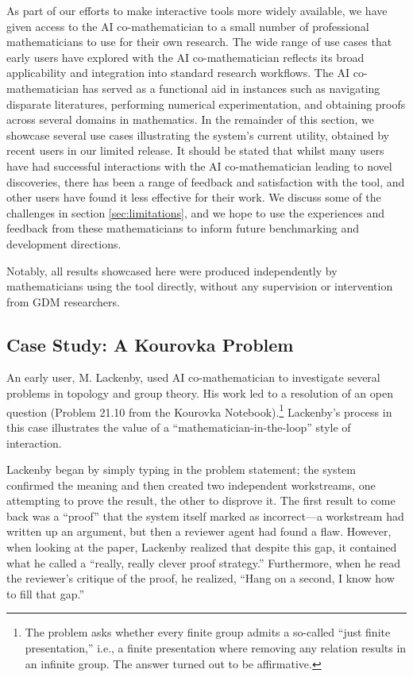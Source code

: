 \documentclass[11pt, a4paper, copyright, gdm]{google}
\begin{document}
As part of our efforts to make interactive tools more widely available, we have given access to the AI co-mathematician to a small number of professional mathematicians to use for their own research.
The wide range of use cases that early users have explored with the AI co-mathematician reflects its broad applicability and integration into standard research workflows.
The AI co-mathematician has served as a functional aid in instances such as navigating disparate literatures, performing numerical experimentation, and obtaining proofs across several domains in mathematics.
In the remainder of this section, we showcase several use cases illustrating the system's current utility, obtained by recent users in our limited release.
It should be stated that whilst many users have had successful interactions with the AI co-mathematician leading to novel discoveries, there has been a range of feedback and satisfaction with the tool, and other users have found it less effective for their work.
We discuss some of the challenges in section \ref{sec:limitations}, and we hope to use the experiences and feedback from these mathematicians to inform future benchmarking and development directions.

Notably, all results showcased here were produced independently by mathematicians using the tool directly, without any supervision or intervention from GDM researchers.


\subsection{Case Study: A Kourovka Problem}


An early user, M. Lackenby, used AI co-mathematician to investigate several problems in topology and group theory.
His work led to a resolution of an open question (Problem 21.10 from the Kourovka Notebook).\footnote{The problem asks whether every finite group admits a so-called ``just finite presentation,'' i.e., a finite presentation where removing any relation results in an infinite group. The answer turned out to be affirmative.}
Lackenby's process in this case illustrates the value of a ``mathematician-in-the-loop'' style of interaction.

Lackenby began by simply typing in the problem statement; the system confirmed the meaning and then created two independent workstreams, one attempting to prove the result, the other to disprove it.
The first result to come back was a ``proof'' that the system itself marked as incorrect---a workstream had written up an argument, but then a reviewer agent had found a flaw.
However, when looking at the paper, Lackenby realized that despite this gap, it contained what he called a ``really, really clever proof strategy.''
Furthermore, when he read the reviewer's critique of the proof, he realized, ``Hang on a second, I know how to fill that gap.''
\end{document}
